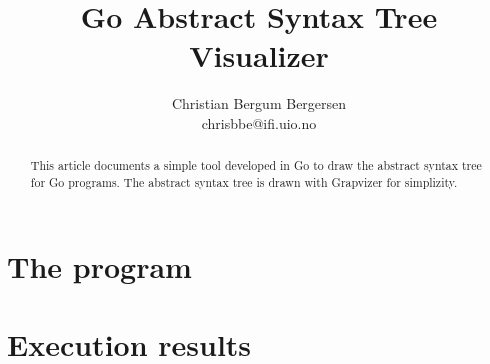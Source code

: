 \documentclass[a4paper,USenglish]{article}
\title{Go Abstract Syntax Tree Visualizer}
\author{Christian Bergum Bergersen\\ chrisbbe@ifi.uio.no}
\begin{document}
\maketitle

\begin{abstract}
This article documents a simple tool developed in Go to draw the abstract syntax tree for
Go programs. The abstract syntax tree is drawn with Grapvizer for simplizity.
\end{abstract}

\section{The program}

\section{Execution results}
\end{document}
